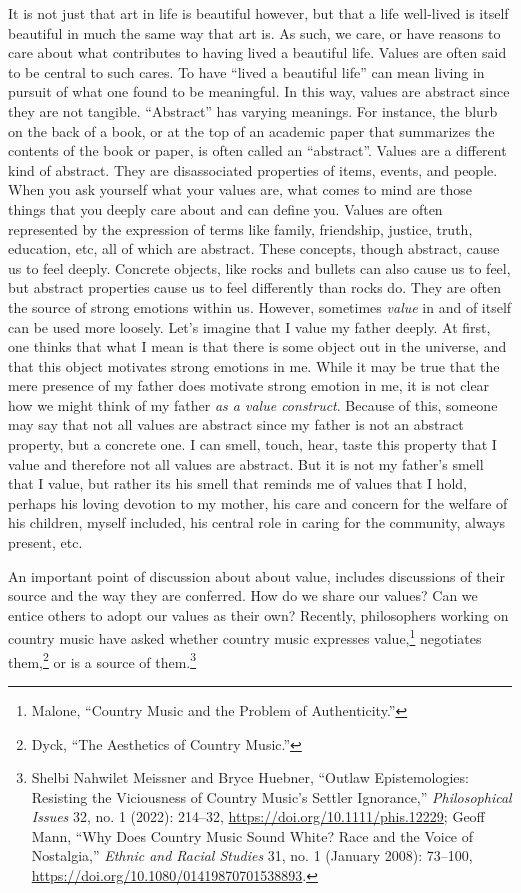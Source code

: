 \documentclass[phdthesis,12pt,final]{wuthesis}
\theoremstyle{definition}
\theoremstyle{definition}
\theoremstyle{definition}
\theoremstyle{definition}
\theoremstyle{remark}
\begin{document}
It is not just that art in life is beautiful however, but that a life well-lived is itself beautiful in much the same way that art is. As such, we care, or have reasons to care about what contributes to having lived a beautiful life. Values are often said to be central to such cares. To have ``lived a beautiful life'' can mean living in pursuit of what one found to be meaningful. In this way, values are abstract since they are not tangible. ``Abstract'' has varying meanings. For instance, the blurb on the back of a book, or at the top of an academic paper that summarizes the contents of the book or paper, is often called an ``abstract''. Values are a different kind of abstract. They are disassociated properties of items, events, and people. When you ask yourself what your values are, what comes to mind are those things that you deeply care about and can define you. Values are often represented by the expression of terms like family, friendship, justice, truth, education, etc, all of which are abstract. These concepts, though abstract, cause us to feel deeply. Concrete objects, like rocks and bullets can also cause us to feel, but abstract properties cause us to feel differently than rocks do. They are often the source of strong emotions within us. However, sometimes \emph{value} in and of itself can be used more loosely. Let's imagine that I value my father deeply. At first, one thinks that what I mean is that there is some object out in the universe, and that this object motivates strong emotions in me. While it may be true that the mere presence of my father does motivate strong emotion in me, it is not clear how we might think of my father \emph{as a value construct}. Because of this, someone may say that not all values are abstract since my father is not an abstract property, but a concrete one. I can smell, touch, hear, taste this property that I value and therefore not all values are abstract. But it is not my father's smell that I value, but rather its his smell that reminds me of values that I hold, perhaps his loving devotion to my mother, his care and concern for the welfare of his children, myself included, his central role in caring for the community, always present, etc.

An important point of discussion about about value, includes discussions of their source and the way they are conferred. How do we share our values? Can we entice others to adopt our values as their own? Recently, philosophers working on country music have asked whether country music expresses value,\footnote{Malone, {``Country {Music} and the {Problem} of {Authenticity}.''}} negotiates them,\footnote{Dyck, {``The Aesthetics of Country Music.''}} or is a source of them.\footnote{Shelbi Nahwilet Meissner and Bryce Huebner, {``Outlaw Epistemologies: {Resisting} the Viciousness of Country Music's Settler Ignorance,''} \emph{Philosophical Issues} 32, no. 1 (2022): 214--32, \url{https://doi.org/10.1111/phis.12229}; Geoff Mann, {``Why Does Country Music Sound White? {Race} and the Voice of Nostalgia,''} \emph{Ethnic and Racial Studies} 31, no. 1 (January 2008): 73--100, \url{https://doi.org/10.1080/01419870701538893}.}
\end{document}
